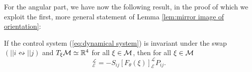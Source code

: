For the angular part, we have now the following result, in the proof of which we exploit the first, more general statement of Lemma \ref{lem:mirror image of orientation}:
\begin{proposition}
\label{prop: angular permutation invariance}
If the control system (\ref{eq:dynamical system}) is invariant under the swap $(||i \leftrightsquigarrow ||j)$ and $T_{\xi}\mathcal{M} \simeq \mathbb{R}^4$ for all $\xi \in \mathcal{M}$, then for all $\xi \in \mathcal{M}$
\begin{equation}
[F_{\theta}(P_{ij} \xi)]_{\mathcal{E}}^{\mathcal{L}} = - S_{ij} [F_{\theta}(\xi)]_{\mathcal{E}}^{\mathcal{L}} P_{ij}.
\end{equation}
\end{proposition}

